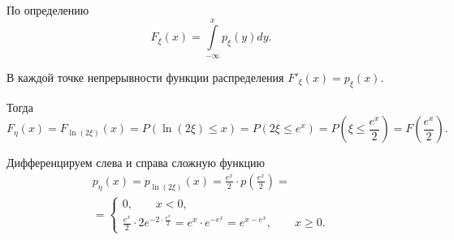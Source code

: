 По определению
$$F_{ \xi } \left( x \right) =
\int \limits_{- \infty }^x p_{ \xi } \left( y \right) dy.$$

В каждой точке непрерывности функции распределения $F'_{ \xi } \left( x \right) = p_{ \xi } \left( x \right) $.

Тогда
$$F_{ \eta } \left( x \right) =
F_{ \ln \left( 2 \xi \right) } \left( x \right) =
P \left( \ln \left( 2 \xi \right) \leq x \right) =
P \left( 2 \xi \leq e^x \right) =
P \left( \xi \leq \frac{e^x}{2} \right) =
F \left( \frac{e^x}{2} \right).$$

Дифференцируем слева и справа сложную функцию
\begin{equation*}
\begin{split}
p_{ \eta } \left( x \right) =
p_{ \ln \left( 2 \xi \right) } \left( x \right) =
\frac{e^x}{2} \cdot p \left( \frac{e^x}{2} \right) = \\
= \begin{cases}
0, \qquad x < 0, \\
\frac{e^x}{2} \cdot 2e^{-2 \cdot \frac{e^x}{2}} =
e^x \cdot e^{-e^x} =
e^{x-e^x}, \qquad x \geq 0.
\end{cases}
\end{split}
\end{equation*}
